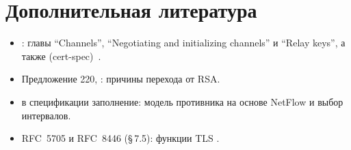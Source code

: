\section*{Дополнительная литература}
\begin{itemize}
  \item {}: главы \enquote{Channels}, \enquote{Negotiating and initializing channels} и \enquote{Relay keys}, а также  (cert-spec)~\cite{torspec}.
  \item Предложение 220, : причины перехода от RSA.
  \item {} в спецификации заполнение: модель противника на основе NetFlow и выбор интервалов.
  \item RFC~5705 и RFC~8446 (§\,7.5): функции TLS .
\end{itemize}

